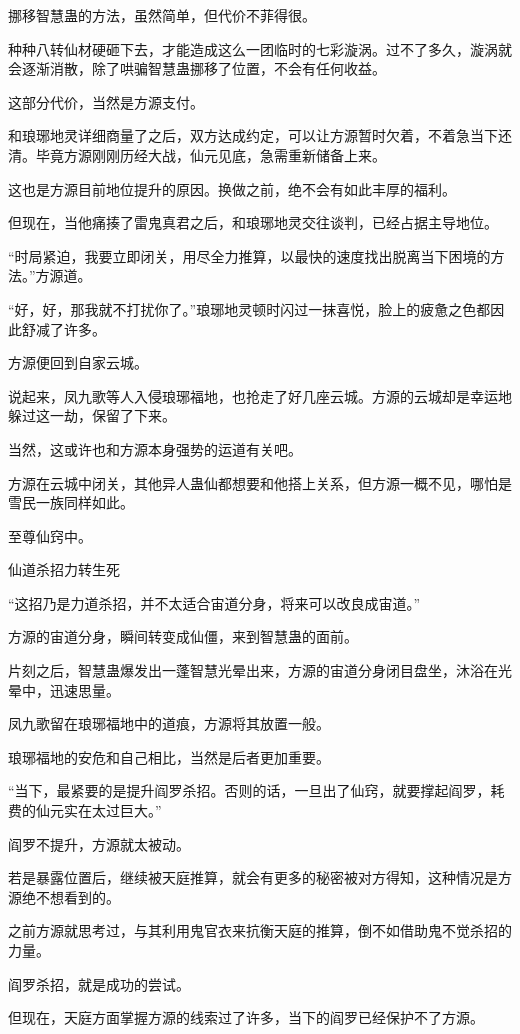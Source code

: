 \begin{this_body}
挪移智慧蛊的方法，虽然简单，但代价不菲得很。

种种八转仙材硬砸下去，才能造成这么一团临时的七彩漩涡。过不了多久，漩涡就会逐渐消散，除了哄骗智慧蛊挪移了位置，不会有任何收益。

这部分代价，当然是方源支付。

和琅琊地灵详细商量了之后，双方达成约定，可以让方源暂时欠着，不着急当下还清。毕竟方源刚刚历经大战，仙元见底，急需重新储备上来。

这也是方源目前地位提升的原因。换做之前，绝不会有如此丰厚的福利。

但现在，当他痛揍了雷鬼真君之后，和琅琊地灵交往谈判，已经占据主导地位。

“时局紧迫，我要立即闭关，用尽全力推算，以最快的速度找出脱离当下困境的方法。”方源道。

“好，好，那我就不打扰你了。”琅琊地灵顿时闪过一抹喜悦，脸上的疲惫之色都因此舒减了许多。

方源便回到自家云城。

说起来，凤九歌等人入侵琅琊福地，也抢走了好几座云城。方源的云城却是幸运地躲过这一劫，保留了下来。

当然，这或许也和方源本身强势的运道有关吧。

方源在云城中闭关，其他异人蛊仙都想要和他搭上关系，但方源一概不见，哪怕是雪民一族同样如此。

至尊仙窍中。

仙道杀招力转生死

“这招乃是力道杀招，并不太适合宙道分身，将来可以改良成宙道。”

方源的宙道分身，瞬间转变成仙僵，来到智慧蛊的面前。

片刻之后，智慧蛊爆发出一蓬智慧光晕出来，方源的宙道分身闭目盘坐，沐浴在光晕中，迅速思量。

凤九歌留在琅琊福地中的道痕，方源将其放置一般。

琅琊福地的安危和自己相比，当然是后者更加重要。

“当下，最紧要的是提升阎罗杀招。否则的话，一旦出了仙窍，就要撑起阎罗，耗费的仙元实在太过巨大。”

阎罗不提升，方源就太被动。

若是暴露位置后，继续被天庭推算，就会有更多的秘密被对方得知，这种情况是方源绝不想看到的。

之前方源就思考过，与其利用鬼官衣来抗衡天庭的推算，倒不如借助鬼不觉杀招的力量。

阎罗杀招，就是成功的尝试。

但现在，天庭方面掌握方源的线索过了许多，当下的阎罗已经保护不了方源。


\end{this_body}
